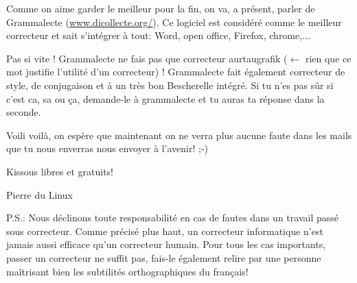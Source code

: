 \documentclass[12pt]{../fiche}
\begin{document}
Comme on aime garder le meilleur pour la fin, on va, a présent, parler de Grammalecte (\url{www.dicollecte.org/}). Ce logiciel est considéré comme le meilleur correcteur et sait s’intégrer à tout: Word,
open office, Firefox, chrome,...

Pas si vite ! Grammalecte ne fais pas que correcteur aurtaugrafik ($\leftarrow$ rien que ce mot justifie l’utilité d’un correcteur) ! Grammalecte fait également correcteur de style, de conjugaison et à un très bon Bescherelle intégré. Si tu n’es pas sûr si c’est ca, sa ou ça, demande-le à grammalecte et tu auras ta réponse dans la seconde.

Voili voilà, on espère que maintenant on ne verra plus aucune faute dans les mails que tu nous enverras nous envoyer à l'avenir! ;-)


Kissous libres et gratuits!


Pierre du Linux


P.S.: Nous déclinons toute responsabilité en cas de fautes dans un travail passé sous correcteur. Comme précisé plus haut, un correcteur informatique n'est jamais aussi efficace qu'un correcteur humain. Pour tous les cas importants, passer un correcteur ne suffit pas, fais-le également relire par une personne maîtrisant bien les subtilités orthographiques du français!
\end{document}
